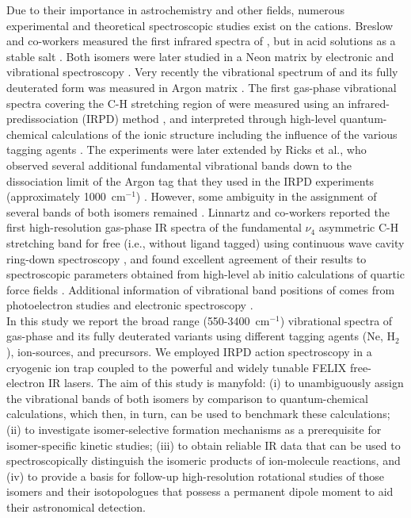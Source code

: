 Due to their importance in astrochemistry and other fields, numerous experimental and theoretical spectroscopic studies exist on the \iso cations. Breslow and co-workers measured the first infrared spectra of \cycn, but in acid solutions as a stable salt \citep{Breslow1970}. Both isomers were later studied in a Neon matrix by electronic and vibrational spectroscopy \citep{Wyss2001}. Very recently the vibrational spectrum of \lin and its fully deuterated form was measured in Argon matrix \citep{Chin2018}. The first gas-phase vibrational spectra covering the C-H stretching region of \iso were measured using an infrared-predissociation (IRPD) method \citep{Roth2002,DRM2002}, and interpreted through high-level quantum-chemical calculations of the ionic structure including the influence of the various tagging agents \citep{BOR2011,BO2011,Botschwina2011}. The experiments were later extended by Ricks et al., who observed several additional fundamental vibrational bands down to the dissociation limit of the Argon tag that they used in the IRPD experiments (approximately 1000~cm$^{-1}$) \citep{RDS2010}. However, some ambiguity in the assignment of several bands of both isomers remained \citep{HTL2011,Duncan2012}. Linnartz and co-workers reported the first high-resolution gas-phase IR spectra of the fundamental $\nu_{4}$ asymmetric C-H stretching band for free (i.e., without ligand tagged) \cyc using continuous wave cavity ring-down spectroscopy \citep{ZDL2014}, and found excellent agreement of their results to spectroscopic parameters obtained from high-level ab initio calculations of quartic force fields \citep{HTL2011}. Additional information of vibrational band positions of \iso comes from photoelectron studies \citep{GLY2012,GGK2018} and electronic spectroscopy \citep{CSD2015}. \\

In this study we report the broad range (550-3400~cm$^{-1}$) vibrational spectra of gas-phase \iso and its fully deuterated variants using different tagging agents (Ne, H$_2$), ion-sources, and precursors. We employed IRPD action spectroscopy in a cryogenic ion trap coupled to the powerful and widely tunable FELIX free-electron IR lasers. The aim of this study is manyfold: (i) to unambiguously assign the vibrational bands of both isomers by comparison to quantum-chemical calculations, which then, in turn, can be used to benchmark these calculations; (ii) to investigate isomer-selective formation mechanisms as a prerequisite for isomer-specific kinetic studies; (iii) to obtain reliable IR data that can be used to spectroscopically distinguish the isomeric \iso products of ion-molecule reactions, and (iv) to provide a basis for follow-up high-resolution rotational studies of those isomers and their isotopologues that possess a permanent dipole moment to aid their astronomical detection.


